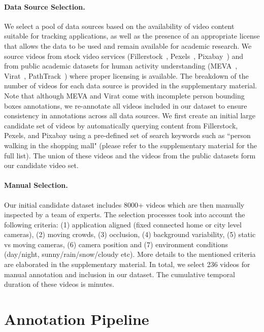 \documentclass[runningheads]{llncs}
\begin{document}
\paragraph{\textbf{Data Source Selection.}}
We select a pool of data sources based on the availability of video content suitable for tracking applications, as well as the presence of an appropriate license that allows the data to be used and remain available for academic research.
We source videos from stock video services (Fillerstock~\cite{fillerstock}, Pexels~\cite{pexels}, Pixabay~\cite{pixabay}) and from public academic datasets for human activity understanding (MEVA~\cite{meva}, Virat~\cite{virat}, PathTrack~\cite{pathtrack}) where proper licensing is available.  The breakdown of the number of videos for each data source is provided in the supplementary material.
Note that although MEVA and Virat come with incomplete person bounding boxes annotations, we re-annotate all videos included in our dataset to ensure consistency in annotations across all data sources. We first create an initial large candidate set of videos by automatically querying content from Fillerstock, Pexels, and Pixabay using a pre-defined set of search keywords such as ``person walking in the shopping mall" (please refer to the supplementary material for the full list). The union of these videos and the videos from the public datasets form our candidate video set.



\paragraph{\textbf{Manual Selection.}}
Our initial candidate dataset includes 8000+ videos which are then manually inspected by a team of experts. The selection processes took into account the following criteria: (1) application aligned (fixed connected home or city level cameras), (2) moving crowds, (3) occlusion, (4) background variability, (5) static vs moving cameras, (6) camera position and (7) environment conditions (day/night, sunny/rain/snow/cloudy etc). More details to the mentioned criteria are elaborated in the supplementary material.
In total, we select 236 videos for manual annotation and inclusion in our dataset. The cumulative temporal duration of these videos is  minutes.




 \section{Annotation Pipeline}\label{sec:annotation}
\end{document}
